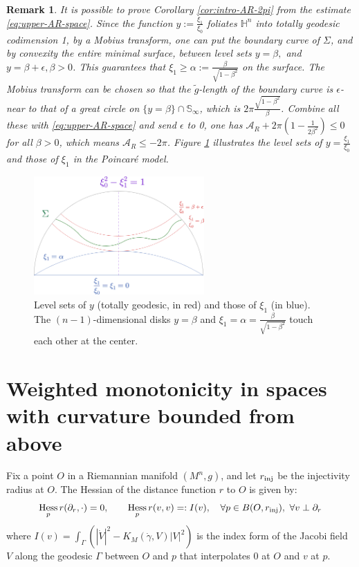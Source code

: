 \documentclass[11pt]{article}
\newtheorem{remark}[theorem]{Remark}
\DeclareMathOperator{\hess}{Hess}
\begin{document}
\begin{remark}
\label{rem:space-est}
It is possible to prove Corollary \ref{cor:intro-AR-2pi}
from the estimate \eqref{eq:upper-AR-space}. Since the function \(y:=\frac{\xi_1}{\xi_0}\)
foliates \(\mathbb{H}^n\) 
into totally geodesic codimension 1, by a Mobius transform, one can put the
boundary curve of \(\Sigma\), and by convexity the entire minimal surface, between level sets \(y=\beta,\) and \(y=\beta+\epsilon, \beta >0\). 
This guarantees that \(\xi_1\geq\alpha :=
\frac{\beta}{\sqrt{1-\beta^2}}\) on the surface. 
The Mobius transform can be chosen so that the \(\tilde g\)-length of the boundary curve is \(\epsilon\)-near to that of a great
circle on \(\{y=\beta\}\cap \mathbb{S}_\infty\), which is \(2\pi
\frac{\sqrt{1-\beta^2}}{\beta}\). Combine all these with \eqref{eq:upper-AR-space} and send
\(\epsilon\) to 0, one has
\(\mathcal{A}_R + 2\pi (1 - \frac{1}{2\beta^2})\leq 0\) for all \(\beta >0\), which
means \(\mathcal{A}_R\leq -2\pi\). Figure \ref{fig:space-est} illustrates the level sets of \(y = \frac{\xi_1}{\xi_0}\)
and those of \(\xi_1\) in the Poincaré model.
\end{remark}

\begin{figure}[hbt!]
    \centering
    \includegraphics[width=6.5cm]{2021-04-28-space-est.png} 
    \caption{Level sets of \( y \) (totally geodesic, in red) and those of \( \xi_1 \) (in blue). The \( (n-1) \)-dimensional disks \( y=\beta\) and \( \xi_1 = \alpha = \frac{\beta}{\sqrt{1-\beta^2}} \) touch each other at the center.}
    \label{fig:space-est}
\end{figure}

\section{Weighted monotonicity in spaces with curvature bounded from above}
\label{sec:org88d2f7f}
Fix a point \(O\) in a Riemannian manifold \((M^n,g)\), and let \(r_{\rm inj}\) be the
injectivity radius at \(O\). The Hessian of the distance function \(r\) to \(O\) is
given by:
\begin{equation}
\label{eq:hess-r}
\hess_p r (\partial_r, \cdot) =0, \qquad \hess_p r (v, v)=: I(v), \quad\forall p\in B(O,r_{\rm inj}),\ \forall v\perp \partial_r
\end{equation}
where \(I(v)=\int_{\Gamma}\left(|\dot V|^2 - K_M(\dot\gamma,V)|V|^2\right)\) is the index
form of the Jacobi field \(V\) along the geodesic \(\Gamma\) between \(O\) and \(p\) that
interpolates \(0\) at \(O\) and \(v\) at \(p\). 
\end{document}
